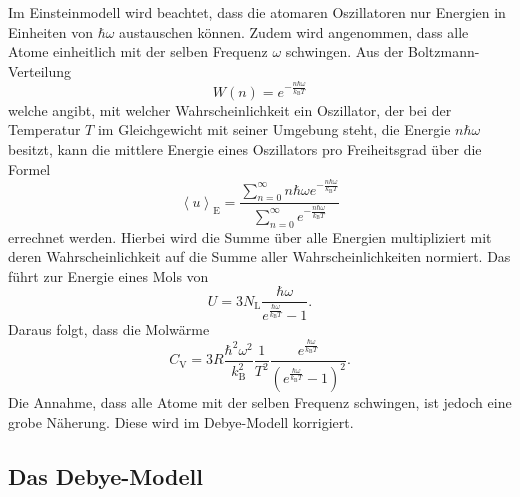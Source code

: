 Im Einsteinmodell wird beachtet, dass die atomaren Oszillatoren nur Energien in Einheiten von $\hbar\omega$ austauschen können.
Zudem wird angenommen, dass alle Atome einheitlich mit der selben Frequenz $\omega$ schwingen.
Aus der Boltzmann-Verteilung
\begin{equation}
  W(n) = e^{-\frac{n\hbar\omega}{k_{\text{B}}T}}
\end{equation}
welche angibt, mit welcher Wahrscheinlichkeit ein Oszillator, der bei der Temperatur $T$ im Gleichgewicht mit seiner Umgebung steht, die Energie $n\hbar\omega$ besitzt, kann die mittlere Energie eines Oszillators pro Freiheitsgrad über die Formel
\begin{equation}
  \left\langle u \right\rangle_{\text{E}} = \frac{\sum_{n=0}^{\infty}n\hbar\omega e^{-\frac{n\hbar\omega}{k_{\text{B}}T}}}{\sum_{n=0}^{\infty} e^{-\frac{n\hbar\omega}{k_{\text{B}}T}}}
\end{equation}
errechnet werden.
Hierbei wird die Summe über alle Energien multipliziert mit deren Wahrscheinlichkeit auf die Summe aller Wahrscheinlichkeiten normiert.
Das führt zur Energie eines Mols von
\begin{equation}
  U = 3N_{\text{L}}\frac{\hbar\omega}{e^{\frac{\hbar\omega}{k_{\text{B}}T}}-1}.
\end{equation}
Daraus folgt, dass die Molwärme
\begin{equation}
  C_{\text{V}} = 3R\frac{\hbar^2\omega^2}{k_{\text{B}}^2}\frac{1}{T^2}\frac{e^{\frac{\hbar\omega}{k_{\text{B}}T}}}{\left(e^{\frac{\hbar\omega}{k_{\text{B}}T}}-1\right)^2}.
\end{equation}
Die Annahme, dass alle Atome mit der selben Frequenz schwingen, ist jedoch eine grobe Näherung. Diese wird im Debye-Modell korrigiert.

\subsection{Das Debye-Modell}

